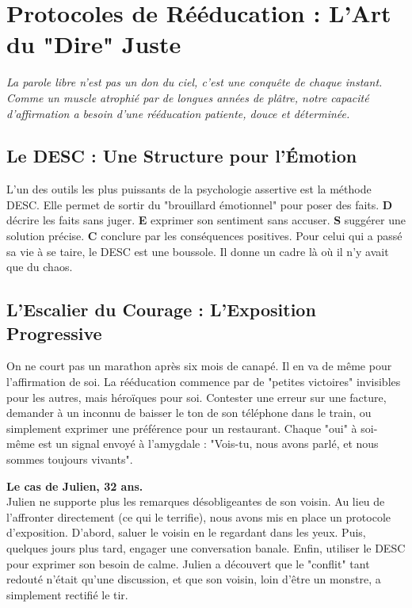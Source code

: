 \chapter{Protocoles de Rééducation : L'Art du "Dire" Juste}

\textit{La parole libre n'est pas un don du ciel, c'est une conquête de chaque instant. Comme un muscle atrophié par de longues années de plâtre, notre capacité d'affirmation a besoin d'une rééducation patiente, douce et déterminée.}

\section{Le DESC : Une Structure pour l'Émotion}
L'un des outils les plus puissants de la psychologie assertive est la méthode DESC. Elle permet de sortir du "brouillard émotionnel" pour poser des faits. \textbf{D} décrire les faits sans juger. \textbf{E} exprimer son sentiment sans accuser. \textbf{S} suggérer une solution précise. \textbf{C} conclure par les conséquences positives. Pour celui qui a passé sa vie à se taire, le DESC est une boussole. Il donne un cadre là où il n'y avait que du chaos.

\section{L'Escalier du Courage : L'Exposition Progressive}
On ne court pas un marathon après six mois de canapé. Il en va de même pour l'affirmation de soi. La rééducation commence par de "petites victoires" invisibles pour les autres, mais héroïques pour soi. Contester une erreur sur une facture, demander à un inconnu de baisser le ton de son téléphone dans le train, ou simplement exprimer une préférence pour un restaurant. Chaque "oui" à soi-même est un signal envoyé à l'amygdale : "Vois-tu, nous avons parlé, et nous sommes toujours vivants".

\begin{NoteClinique}
\textbf{Le cas de Julien, 32 ans.} \\
Julien ne supporte plus les remarques désobligeantes de son voisin. Au lieu de l'affronter directement (ce qui le terrifie), nous avons mis en place un protocole d'exposition. D'abord, saluer le voisin en le regardant dans les yeux. Puis, quelques jours plus tard, engager une conversation banale. Enfin, utiliser le DESC pour exprimer son besoin de calme. Julien a découvert que le "conflit" tant redouté n'était qu'une discussion, et que son voisin, loin d'être un monstre, a simplement rectifié le tir.
\end{NoteClinique}

